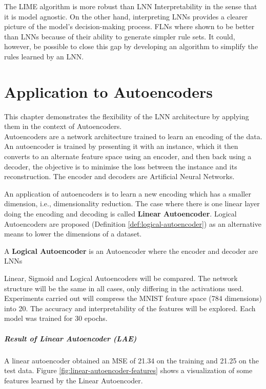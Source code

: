 The LIME algorithm is more robust than LNN Interpretability in the sense that it is model agnostic. On the other hand, interpreting LNNs provides a clearer picture of the model's decision-making process. FLNs where shown to be better than LNNs because of their ability to generate simpler rule sets. It could, however, be possible to close this gap by developing an algorithm to simplify the rules learned by an LNN.

\chapter{Application to Autoencoders} \label{C:lnn-application}
This chapter demonstrates the flexibility of the LNN architecture by applying them in the context of Autoencoders. \\

Autoencoders \cite{baldi2012complex} \cite{hinton2006reducing} are a network architecture trained to learn an encoding of the data. An autoencoder is trained by presenting it with an instance, which it then converts to an alternate feature space using an encoder, and then back using a decoder, the objective is to minimise the loss between the instance and its reconstruction. The encoder and decoders are Artificial Neural Networks. 

An application of autoencoders is to learn a new encoding which has a smaller dimension, i.e., dimensionality reduction. The case where there is one linear layer doing the encoding and decoding is called \textbf{Linear Autoencoder}. Logical Autoencoders are proposed (Definition \ref{def:logical-autoencoder}) as an alternative means to lower the dimensions of a dataset.

\begin{definition} \label{def:logical-autoencoder}
	A \textbf{Logical Autoencoder} is an Autoencoder where the encoder and decoder are LNNs
\end{definition}

Linear, Sigmoid and Logical Autoencoders will be compared. The network structure will be the same in all cases, only differing in the activations used. Experiments carried out will compress the MNIST feature space (784 dimensions) into 20. The accuracy and interpretability of the features will be explored. Each model was trained for 30 epochs.

\paragraph{Result of Linear Autoencoder (LAE)}
A linear autoencoder obtained an MSE of 21.34 on the training and 21.25 on the test data. Figure \ref{fig:linear-autoencoder-features} shows a visualization of some features learned by the Linear Autoencoder.

